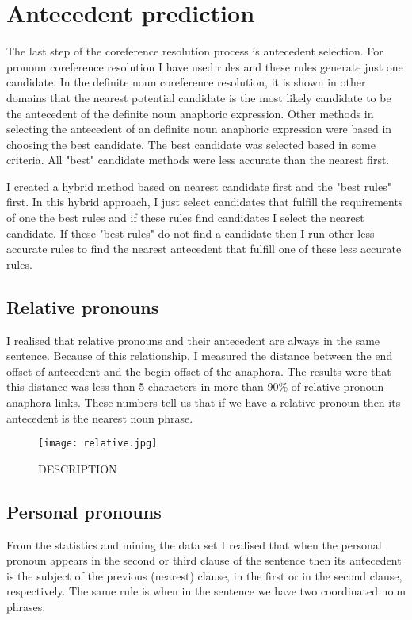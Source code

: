 \section{Antecedent prediction}
The last step of the coreference resolution process is antecedent selection. For pronoun coreference resolution I have used rules and these rules generate just one candidate. In the definite noun coreference resolution, it is shown in other domains that the nearest potential candidate is the most likely candidate to be the antecedent of the definite noun anaphoric expression. Other methods in selecting the antecedent of an definite noun anaphoric expression were based in choosing the best candidate. The best candidate was selected based in some criteria. All  "best" candidate methods were less accurate than the nearest first. 
 
I created a hybrid method based on nearest candidate first and the "best rules" first. In this hybrid approach, I just select candidates that fulfill the requirements of one the best rules and if these rules find candidates I select the nearest candidate. If these "best rules" do not find a candidate then I run other less accurate rules to find the nearest  antecedent that fulfill one of these less accurate rules.   

\subsection{Relative pronouns}
I realised that relative pronouns and their antecedent are always in the same sentence. Because of this relationship, I measured the distance between the end offset of antecedent and the begin offset of the anaphora. The results were that this distance was less than 5 characters in more than 90\% of relative pronoun anaphora links. These numbers tell us that if we have a relative pronoun then its antecedent is the nearest noun phrase.

\begin{figure}[h]
  \begin{center}
	 \texttt{[image: relative.jpg]} 
 	 \caption{ DESCRIPTION }
	 \label{Figure 11}
  \end{center}
\end{figure}
 
\subsection{Personal pronouns} 
From the statistics and mining the data set I realised that when  the personal pronoun appears in the second or third clause of the sentence then its antecedent is the  subject of the previous (nearest) clause, in the first or in the second clause, respectively.  The same rule is when in the sentence we have two coordinated noun phrases. 

